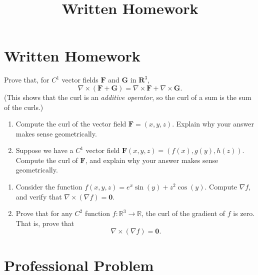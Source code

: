 \documentclass{ximera}
\title{Written Homework}
\begin{document}
\begin{abstract}
\end{abstract}
\maketitle

\section{Written Homework}

\begin{problem}
Prove that, for $C^1$ vector fields $\mathbf{F}$ and $\mathbf{G}$ in $\mathbf{R}^3$,
\[
\nabla \times (\mathbf{F}+\mathbf{G}) = \nabla \times \mathbf{F} + \nabla \times \mathbf{G}.
\]
(This shows that the curl is an \emph{additive operator}, so the curl of a sum is the sum of the curls.)
\end{problem}

\begin{problem}
\begin{enumerate}
\item Compute the curl of the vector field $\mathbf{F} = (x,y,z)$. Explain why your answer makes sense geometrically.
\item Suppose we have a $C^1$ vector field $\mathbf{F}(x,y,z) = (f(x), g(y), h(z))$. Compute the curl of $\mathbf{F}$, and explain why your answer makes sense geometrically.
\end{enumerate}
\end{problem}

\begin{problem}
\begin{enumerate}
\item Consider the function $f(x,y,z) = e^x\sin(y) + z^2\cos(y)$. Compute $\nabla f$, and verify that $\nabla \times(\nabla f) = \mathbf{0}$.
\item Prove that for any $C^2$ function $f:\mathbb{R}^3\rightarrow\mathbb{R}$, the curl of the gradient of $f$ is zero. That is, prove that
\[
\nabla \times(\nabla f) = \mathbf{0}.
\]
\end{enumerate}
\end{problem}

\section{Professional Problem}
\end{document}
